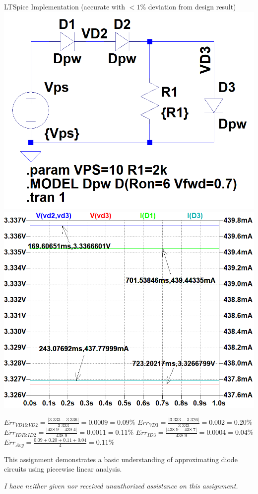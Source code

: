 \documentclass[12pt,letterpaper,titlepage]{article}
\begin{document}
\begin{raggedright}
\begin{center}
LTSpice Implementation (accurate with $< 1\%$ deviation from design result)
\includegraphics[width=.49\textwidth, height=\textheight, keepaspectratio=true]{ds2b}
\includegraphics[width=.49\textwidth, height=\textheight, keepaspectratio=true]{ds2c}
\begin{paracol}{2}
$Err_{VD1 \& VD2} = \frac{|3.333-3.336|}{3.333} = 0.0009 = 0.09\%$
\switchcolumn
$Err_{VD3} = \frac{|3.333-3.326|}{3.333} = 0.002 = 0.20\%$
\switchcolumn
$Err_{IDI \& ID2} = \frac{|438.9-439.4|}{438.9} = 0.0011 = 0.11\%$
\switchcolumn
$Err_{ID3} = \frac{|438.9-438.7|}{438.9} = 0.0004 = 0.04\%$
\switchcolumn
$Err_{Avg} = \frac{0.09 + 0.20 + 0.11 + 0.04}{4} = 0.11\%$
\end{paracol}
\end{center}

This assignment demonstrates a basic understanding of approximating diode circuits using piecewise linear analysis.

\textit{I have neither given nor received unauthorized assistance on this assignment.}


\end{raggedright}
\end{document}
